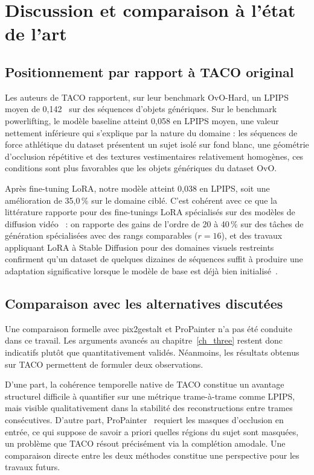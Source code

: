\section{Discussion et comparaison à l'état de l'art}

\subsection{Positionnement par rapport à TACO original}

Les auteurs de TACO rapportent, sur leur benchmark OvO-Hard, un LPIPS moyen de 0,142~\cite{TACO-2025} sur des séquences d'objets génériques. Sur le benchmark powerlifting, le modèle baseline atteint 0,058 en LPIPS moyen, une valeur nettement inférieure qui s'explique par la nature du domaine : les séquences de force athlétique du dataset présentent un sujet isolé sur fond blanc, une géométrie d'occlusion répétitive et des textures vestimentaires relativement homogènes, ces conditions sont plus favorables que les objets génériques du dataset OvO.

Après fine-tuning LoRA, notre modèle atteint 0,038 en LPIPS, soit une amélioration de 35,0\,\% sur le domaine ciblé. C'est cohérent avec ce que la littérature rapporte pour des fine-tunings LoRA spécialisés sur des modèles de diffusion vidéo~\cite{LoRA-2021} : on rapporte des gains de l'ordre de 20 à 40\,\% sur des tâches de génération spécialisées avec des rangs comparables ($r = 16$), et des travaux appliquant LoRA à Stable Diffusion pour des domaines visuels restreints confirment qu'un dataset de quelques dizaines de séquences suffit à produire une adaptation significative lorsque le modèle de base est déjà bien initialisé~\cite{DreamBooth-2023}.

\subsection{Comparaison avec les alternatives discutées}

Une comparaison formelle avec pix2gestalt et ProPainter n'a pas été conduite dans ce travail. Les arguments avancés au chapitre~\ref{ch_three} restent donc indicatifs plutôt que quantitativement validés. Néanmoins, les résultats obtenus sur TACO permettent de formuler deux observations.

D'une part, la cohérence temporelle native de TACO constitue un avantage structurel difficile à quantifier sur une métrique trame-à-trame comme LPIPS, mais visible qualitativement dans la stabilité des reconstructions entre trames consécutives. D'autre part, ProPainter~\cite{ProPainter-2023} requiert les masques d'occlusion en entrée, ce qui suppose de savoir a priori quelles régions du sujet sont masquées, un problème que TACO résout précisément via la complétion amodale. Une comparaison directe entre les deux méthodes constitue une perspective pour les travaux futurs.

